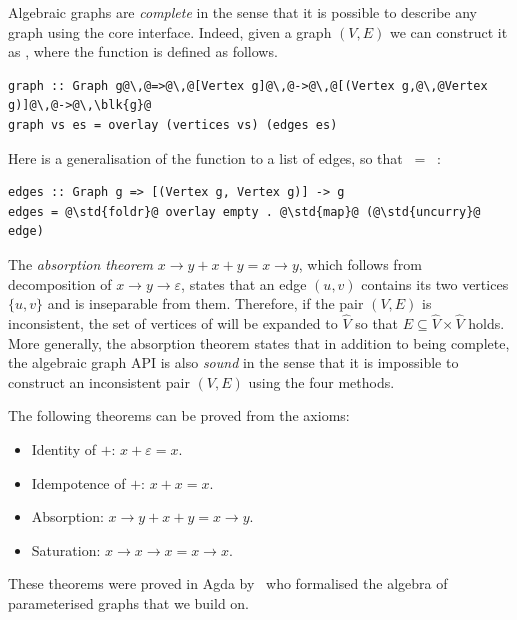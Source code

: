 Algebraic graphs are \emph{complete} in the sense that it is possible to describe
any graph using the core interface. Indeed, given a graph $(V,E)$ we can construct
it as , where the function  is defined as follows.

\begin{verbatim}
graph :: Graph g@\,@=>@\,@[Vertex g]@\,@->@\,@[(Vertex g,@\,@Vertex g)]@\,@->@\,\blk{g}@
graph vs es = overlay (vertices vs) (edges es)
\end{verbatim}

Here  is a generalisation of the function  to a list of edges,
so that  $\ =\ $ :

\begin{verbatim}
edges :: Graph g => [(Vertex g, Vertex g)] -> g
edges = @\std{foldr}@ overlay empty . @\std{map}@ (@\std{uncurry}@ edge)
\end{verbatim}

The \emph{absorption theorem} $x \rightarrow y + x + y = x \rightarrow y$, which
follows from decomposition of $x \rightarrow y \rightarrow \varepsilon$, states
that an edge $(u,v)$ contains its two vertices $\{u,v\}$ and is inseparable from
them. Therefore, if the pair $(V,E)$ is inconsistent, the set of vertices of
 will be expanded to $\hat{V}$ so that
$E\subseteq \hat{V}\times \hat{V}$ holds. More generally, the absorption
theorem states that in addition to being complete, the algebraic graph
API is also \emph{sound} in the sense that it is impossible to construct
an inconsistent pair $(V,E)$ using the four  methods.

The following theorems can be proved from the axioms:

\begin{itemize}
    \item Identity of $+$: $x + \varepsilon = x$.
    \item Idempotence of $+$: $x + x = x$.
    \item Absorption: $x \rightarrow y + x + y = x \rightarrow y$.
    \item Saturation: $x \rightarrow x \rightarrow x = x \rightarrow x$.
\end{itemize}

These theorems were proved in Agda by~\citet{2014_alekseyev_phd} who formalised
the algebra of parameterised graphs that we build on.

